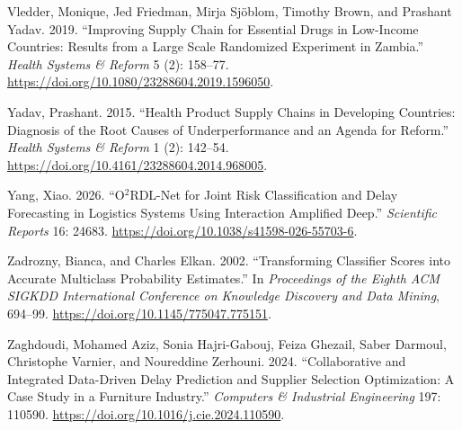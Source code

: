\documentclass[
]{article}
\newlength{\cslhangindent}
\newenvironment{CSLReferences}[2] %
 {\begin{list}{}{%
  \setlength{\itemindent}{0pt}
  \setlength{\leftmargin}{0pt}
  \setlength{\parsep}{0pt}
  \ifodd #1
   \setlength{\leftmargin}{\cslhangindent}
   \setlength{\itemindent}{-1\cslhangindent}
  \fi
  \setlength{\itemsep}{#2\baselineskip}}}
 {\end{list}}
\begin{document}
\begin{CSLReferences}{1}{0}
Vledder, Monique, Jed Friedman, Mirja Sjöblom, Timothy Brown, and
Prashant Yadav. 2019. {``Improving Supply Chain for Essential Drugs in
Low-Income Countries: Results from a Large Scale Randomized Experiment
in Zambia.''} \emph{Health Systems \& Reform} 5 (2): 158--77.
\url{https://doi.org/10.1080/23288604.2019.1596050}.

Yadav, Prashant. 2015. {``Health Product Supply Chains in Developing
Countries: Diagnosis of the Root Causes of Underperformance and an
Agenda for Reform.''} \emph{Health Systems \& Reform} 1 (2): 142--54.
\url{https://doi.org/10.4161/23288604.2014.968005}.

Yang, Xiao. 2026. {``O\(^2\)RDL-Net for Joint Risk Classification and
Delay Forecasting in Logistics Systems Using Interaction Amplified
Deep.''} \emph{Scientific Reports} 16: 24683.
\url{https://doi.org/10.1038/s41598-026-55703-6}.

Zadrozny, Bianca, and Charles Elkan. 2002. {``Transforming Classifier
Scores into Accurate Multiclass Probability Estimates.''} In
\emph{Proceedings of the Eighth ACM SIGKDD International Conference on
Knowledge Discovery and Data Mining}, 694--99.
\url{https://doi.org/10.1145/775047.775151}.

Zaghdoudi, Mohamed Aziz, Sonia Hajri-Gabouj, Feiza Ghezail, Saber
Darmoul, Christophe Varnier, and Noureddine Zerhouni. 2024.
{``Collaborative and Integrated Data-Driven Delay Prediction and
Supplier Selection Optimization: A Case Study in a Furniture
Industry.''} \emph{Computers \& Industrial Engineering} 197: 110590.
\url{https://doi.org/10.1016/j.cie.2024.110590}.

\end{CSLReferences}
\end{document}
